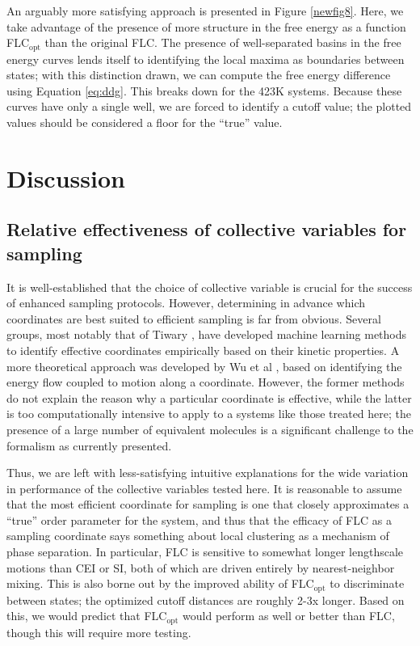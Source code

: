 \documentclass{biophys-new}
\begin{document}
An arguably more satisfying approach is presented in Figure \ref{newfig8}. Here, we take advantage of the presence of more structure in the free energy as a function FLC$_{\text{opt}}$ than the original FLC. The presence of well-separated basins in the free energy curves lends itself to identifying the local maxima as boundaries between states; with this distinction drawn, we can compute the free energy difference using Equation \ref{eq:ddg}. This breaks down for the 423K systems. Because these curves have only a single well, we are forced to identify a cutoff value; the plotted values should be considered a floor for the ``true'' value.


\section*{Discussion}

\subsection*{Relative effectiveness of collective variables for sampling}

It is well-established that the choice of collective variable is crucial for the success of enhanced sampling protocols\cite{Valsson2016, Yang2019b, Henin2022}. However, determining in advance which coordinates are best suited to efficient sampling is far from obvious. Several groups, most notably that of Tiwary \cite{Berne2016,Berne2017,Tiwary2018b,Tiwary2021}, have developed machine learning methods to identify effective coordinates empirically based on their kinetic properties.  A more theoretical approach was developed by Wu et al \cite{Wu2022}, based on identifying the energy flow coupled to motion along a coordinate.  However, the former methods do not explain the reason why a particular coordinate is effective, while the latter is too computationally intensive to apply to a systems like those treated here; the presence of a large number of equivalent molecules is a significant challenge to the formalism as currently presented.

Thus, we are left with less-satisfying intuitive explanations for the wide variation in performance of the collective variables tested here.  It is reasonable to assume that the most efficient coordinate for sampling is one that closely approximates a ``true'' order parameter for the system, and thus that the efficacy of FLC as a sampling coordinate says something about local clustering as a mechanism of phase separation.  In particular, FLC is sensitive to somewhat longer lengthscale motions than CEI or SI, both of which are driven entirely by nearest-neighbor mixing. This is also borne out by the improved ability of FLC$_{\text{opt}}$ to discriminate between states; the optimized cutoff distances are roughly 2-3x longer.  Based on this, we would predict that FLC$_\mathrm{opt}$ would perform as well or better than FLC, though this will require more testing.
\end{document}
